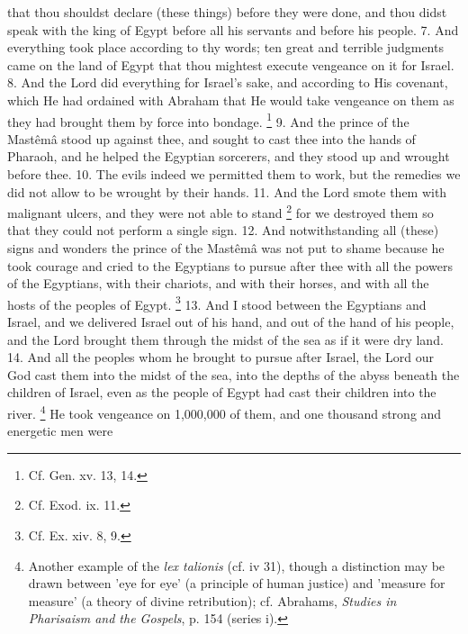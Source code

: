that thou shouldst declare (these things) before they were done, and thou didst speak with the king of Egypt before all his servants and before his people. 7. And everything took place according to thy words; ten great and terrible judgments came on the land of Egypt that thou mightest execute vengeance on it for Israel. 8. And the Lord did everything for Israel's sake, and according to His covenant, which He had ordained with Abraham that He would take vengeance on them as they had brought them by force into bondage. \footnote{Cf. Gen. xv. 13, 14.} 9. And the prince of the Mastêmâ stood up against thee, and sought to cast thee into the hands of Pharaoh, and he helped the Egyptian sorcerers, and they stood up and wrought before thee. 10. The evils indeed we permitted them to work, but the remedies we did not allow to be wrought by their hands. 11. And the Lord smote them with malignant ulcers, and they were not able to stand \footnote{Cf. Exod. ix. 11.} for we destroyed them so that they could not perform a single sign. 12. And notwithstanding all (these) signs and wonders the prince of the Mastêmâ was not put to shame because he took courage and cried to the Egyptians to pursue after thee with all the powers of the Egyptians, with their chariots, and with their horses, and with all the hosts of the peoples of Egypt. \footnote{Cf. Ex. xiv. 8, 9.} 13. And I stood between the Egyptians and Israel, and we delivered Israel out of his hand, and out of the hand of his people, and the Lord brought them through the midst of the sea as if it were dry land. 14. And all the peoples whom he brought to pursue after Israel, the Lord our God cast them into the midst of the sea, into the depths of the abyss beneath the children of Israel, even as the people of Egypt had cast their children into the river. \footnote{Another example of the \emph{lex talionis} (cf. iv 31), though a distinction may be drawn between 'eye for eye' (a principle of human justice) and 'measure for measure' (a theory of divine retribution); cf. Abrahams, \emph{Studies in Pharisaism and the Gospels}, p. 154 (series i).} He took vengeance on 1,000,000 of them, and one thousand strong and energetic men were

